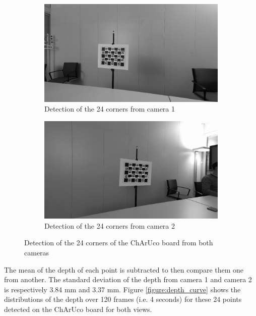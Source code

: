 \begin{figure}[H]
\centering
  \begin{subfigure}[b]{0.48 \textwidth}
    \includegraphics[width=\textwidth]{images/visual_enhancement/master_corner_detected_resized.png}
    \caption{Detection of the 24 corners from camera 1}
    \label{figure:master_corner_detected_resized}
  \end{subfigure}
  \hfill
  \begin{subfigure}[b]{0.48 \textwidth}
    \includegraphics[width=\textwidth]{images/visual_enhancement/sub_corner_detected_resized.png}
    \caption{Detection of the 24 corners from camera 2}
    \label{figure:sub_corner_detected_resized}
  \end{subfigure}
  \caption{Detection of the 24 corners of the ChArUco board from both cameras}
  \label{figure:corner_detected}
\end{figure}

The mean of the depth of each point is subtracted to then compare them one from another. The standard deviation of the depth from camera 1 and camera 2 is respectively 3.84 mm and 3.37 mm. Figure \ref{figure:depth_curve} shows the distributions of the depth over 120 frames (i.e. 4 seconds) for these 24 points detected on the ChArUco board for both views.

